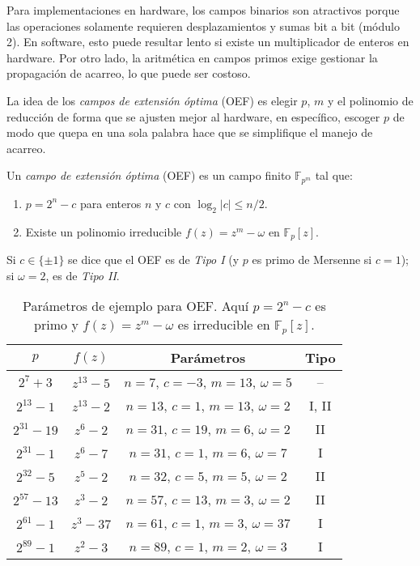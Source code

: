Para implementaciones en hardware, los campos binarios son atractivos porque las operaciones solamente requieren desplazamientos y sumas bit a bit (módulo 2). En software, esto puede resultar lento si existe un multiplicador de enteros en hardware. Por otro lado, la aritmética en campos primos exige gestionar la propagación de acarreo, lo que puede ser costoso.

La idea de los \emph{campos de extensión óptima} (OEF) es elegir \(p\), \(m\) y el polinomio de reducción de forma que se ajusten mejor al hardware, en específico, escoger \(p\) de modo que quepa en una sola palabra hace que se simplifique el manejo de acarreo.

\begin{definicion}
Un \emph{campo de extensión óptima} (OEF) es un campo finito \(\mathbb{F}_{p^m}\) tal que:
\begin{enumerate}
  \item \(p = 2^n - c\) para enteros \(n\) y \(c\) con \(\log_2|c|\le n/2\).
  \item Existe un polinomio irreducible \(f(z)=z^m - \omega\) en \(\mathbb{F}_p[z]\).
\end{enumerate}
Si \(c\in\{\pm1\}\) se dice que el OEF es de \emph{Tipo I} (y \(p\) es primo de Mersenne si \(c=1\)); si \(\omega=2\), es de \emph{Tipo II}.
\end{definicion}

\begin{table}[H]
  \centering
  \begin{tabular}{cccc}
    \hline
    \(p\)               & \(f(z)\)       & Parámetros                 & Tipo     \\
    \hline
    \(2^7+3\)          & \(z^{13}-5\)   & \(n=7\), \(c=-3\), \(m=13\), \(\omega=5\)   & –        \\
    \(2^{13}-1\)       & \(z^{13}-2\)   & \(n=13\), \(c=1\), \(m=13\), \(\omega=2\)   & I, II    \\
    \(2^{31}-19\)      & \(z^{6}-2\)    & \(n=31\), \(c=19\), \(m=6\), \(\omega=2\)    & II       \\
    \(2^{31}-1\)       & \(z^{6}-7\)    & \(n=31\), \(c=1\), \(m=6\), \(\omega=7\)     & I        \\
    \(2^{32}-5\)       & \(z^{5}-2\)    & \(n=32\), \(c=5\), \(m=5\), \(\omega=2\)     & II       \\
    \(2^{57}-13\)      & \(z^{3}-2\)    & \(n=57\), \(c=13\), \(m=3\), \(\omega=2\)    & II       \\
    \(2^{61}-1\)       & \(z^{3}-37\)   & \(n=61\), \(c=1\), \(m=3\), \(\omega=37\)    & I        \\
    \(2^{89}-1\)       & \(z^{2}-3\)    & \(n=89\), \(c=1\), \(m=2\), \(\omega=3\)     & I        \\
    \hline
  \end{tabular}
  \caption{Parámetros de ejemplo para OEF. Aquí \(p=2^n-c\) es primo y \(f(z)=z^m-\omega\) es irreducible en \(\mathbb{F}_p[z]\).}
  \label{tab:oef_params}
\end{table}

